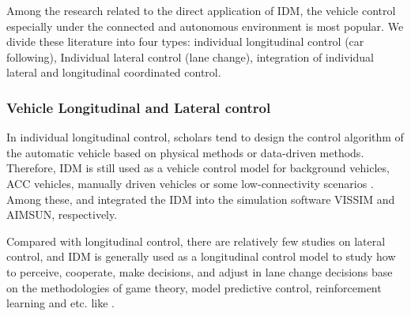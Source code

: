 \documentclass[a4paper,fleqn]{cas-sc}
\begin{document}
Among the research related to the direct application of IDM, the vehicle control especially under the connected and autonomous environment is most popular. We divide these literature into four types: individual longitudinal control (car following),
Individual lateral control (lane change), integration of individual lateral and longitudinal coordinated control.

\subsubsection{Vehicle Longitudinal and Lateral control}

In individual longitudinal control, scholars tend to design the control algorithm of the automatic vehicle based on physical methods or data-driven methods. Therefore, IDM is still used as a vehicle control model for background vehicles, ACC vehicles, manually driven vehicles or some low-connectivity scenarios \citep{juPredictiveCruiseControllerElectric2023a,kamal_efficient_2016,kamalLookAheadDrivingSchemesEfficient2022a,li_deep_2022,li_effect_2015,liu_semantic_2023,liu_potential_2023,liuSpatiotemporalTrajectoryPlanningAutonomous2024a,luLearningDriverSpecificBehaviorOvertaking2018a,ma_energetic_2022,maPersonalizedDrivingBehaviorsFuel2022a,manolis_real_2020,shiConnectedAutomatedVehicleCooperative2021b,shiDeepReinforcementLearningBased2023b,suo_model-free_2024,tangHighwayDecisionMakingMotionPlanning2022a,tas_making_2018,toghi_social_2022,valiente_prediction-aware_2024,wegener_automated_2021,wuFlowModularLearningFramework2022a,wu_hybrid_2023,yan_unified_2023,yangIsolatedIntersectionControlVarious2016a,yuAssessmentDynamicPlatoonInformation2023a,yuanPredictiveEnergyManagementStrategy2019,zhang_stackelberg_2024,zhangNoMoreRoadBullying2023a,zhou_development_2020,milanesModelingCooperativeAutonomousAdaptive2014b,fernandes_platooning_2012,vivekCyberphysicalRisksHackedInternetconnected2019a}. Among these, \cite{zhangNoMoreRoadBullying2023a} and \cite{manolis_real_2020} integrated the IDM into the simulation software VISSIM and AIMSUN, respectively.

Compared with longitudinal control, there are relatively few studies on lateral control, and IDM is generally used as a longitudinal control model to study how to perceive, cooperate, make decisions, and adjust in lane change decisions base on the methodologies of game theory, model predictive control, reinforcement learning and etc. like \citep{chen_adversarial_2022,gongGameTheoryBasedDecisionMakingIterative2023a,guIntegratedEcoDrivingAutomationIntelligent2022a,hwang_autonomous_2022,li_bounded_2024,liuMultistepCooperativeLaneChange2024a,liu_interaction-aware_2023,scheel_recurrent_2022,sheng_cooperation-aware_2023,sunberg_improving_2022,wangModelingBoundedRationalityDiscretionary2022a,zhang_game_2020}.
\end{document}

